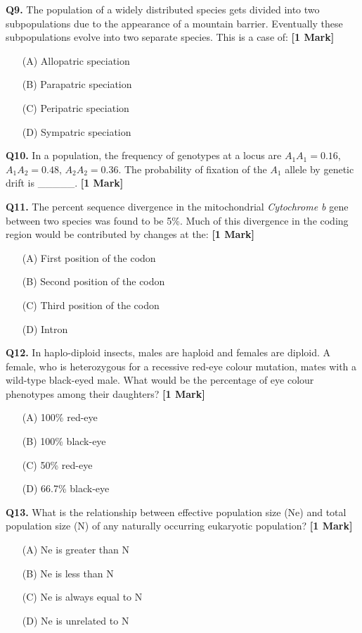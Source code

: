 \documentclass[11pt]{article}
\newcommand{\questiona}[2]{
    \noindent\textbf{Q#2.} #1 \hfill \textbf{[1 Mark]}
}
\begin{document}
\questiona{The population of a widely distributed species gets divided into two subpopulations due to the appearance of a mountain barrier. Eventually these subpopulations evolve into two separate species. This is a case of:}{9}
\begin{enumerate}
    \item[(A)] Allopatric speciation  
    \item[(B)] Parapatric speciation  
    \item[(C)] Peripatric speciation  
    \item[(D)] Sympatric speciation  
\end{enumerate}
\vspace{0.5cm}

\questiona{In a population, the frequency of genotypes at a locus are $A_1A_1 = 0.16$, $A_1A_2 = 0.48$, $A_2A_2 = 0.36$. The probability of fixation of the $A_1$ allele by genetic drift is \_\_\_\_\_.}{10}
\vspace{0.5cm}

\questiona{The percent sequence divergence in the mitochondrial \textit{Cytochrome b} gene between two species was found to be 5\%. Much of this divergence in the coding region would be contributed by changes at the:}{11}
\begin{enumerate}
    \item[(A)] First position of the codon  
    \item[(B)] Second position of the codon  
    \item[(C)] Third position of the codon  
    \item[(D)] Intron  
\end{enumerate}
\vspace{0.5cm}

\questiona{In haplo-diploid insects, males are haploid and females are diploid. A female, who is heterozygous for a recessive red-eye colour mutation, mates with a wild-type black-eyed male. What would be the percentage of eye colour phenotypes among their daughters?}{12}
\begin{enumerate}
    \item[(A)] 100\% red-eye  
    \item[(B)] 100\% black-eye  
    \item[(C)] 50\% red-eye  
    \item[(D)] 66.7\% black-eye  
\end{enumerate}
\vspace{0.5cm}

\questiona{What is the relationship between effective population size (Ne) and total population size (N) of any naturally occurring eukaryotic population?}{13}
\begin{enumerate}
    \item[(A)] Ne is greater than N  
    \item[(B)] Ne is less than N  
    \item[(C)] Ne is always equal to N  
    \item[(D)] Ne is unrelated to N  
\end{enumerate}
\vspace{0.5cm}
\end{document}
